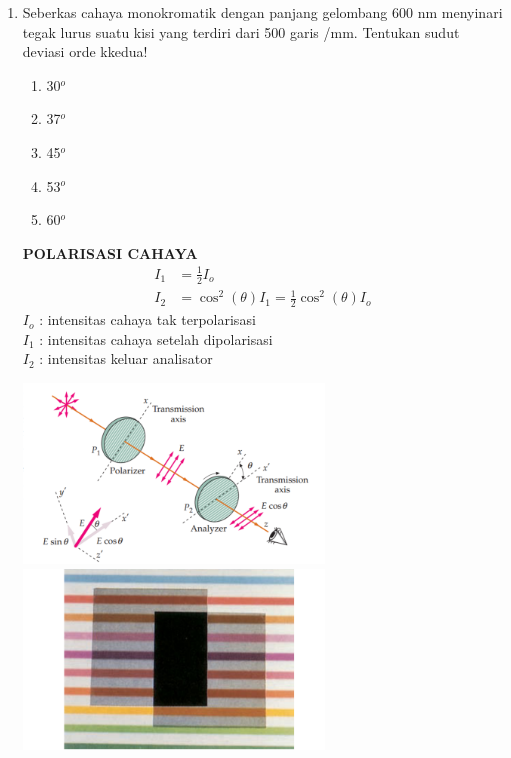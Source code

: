 \documentclass[10pt,a4paper]{extarticle}
\newcommand{\pilgani}[1]{                            \vspace{-0.3cm}\begin{multicols}{2}
 \begin{enumerate}[label=\Alph*., itemsep=0pt,topsep=0pt,leftmargin=*,align=Center]#1                     \end{enumerate}
 \phantom{ini cuma sapi, wedus, dan ayam}
 \end{multicols}}
\begin{document}
\begin{multicols*}{2}
\begin{enumerate}
\item Seberkas cahaya monokromatik dengan panjang gelombang 600 nm menyinari tegak lurus suatu kisi yang terdiri dari 500 garis /mm. Tentukan sudut deviasi orde kkedua!  \pilgani{ \item 30$^o$
        \item 37$^o$
        \item 45$^o$
        \item 53$^o$
        \item 60$^o$
        }

\vspace{4cm}






\textbf{POLARISASI CAHAYA}\\
\begin{align*}
 I_1 &= \frac{1}{2} I_o\\
I_2 &= \cos^2 (\theta) I_1 = \frac{1}{2}\cos^2(\theta) I_o
\end{align*}
$I_o$ : intensitas cahaya tak terpolarisasi\\
$I_1$ : intensitas cahaya setelah dipolarisasi\\
$I_2$ : intensitas keluar analisator 

\includegraphics[width=8cm]{pic/polarisasi}
\includegraphics[width=8cm]{pic/polarisasi2}


\end{enumerate}
\end{multicols*}
\end{document}
